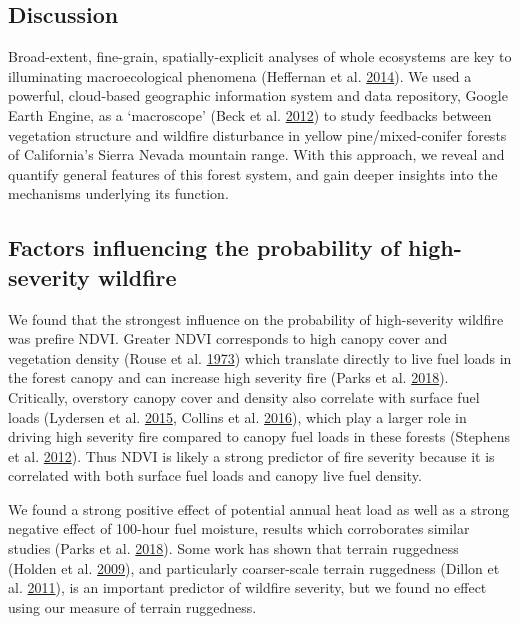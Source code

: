 \documentclass[twoside,12pt,final]{ucthesis-CA2012}
\begin{document}
\begin{ucmainmatter}
\section{Discussion}\label{discussion}

Broad-extent, fine-grain, spatially-explicit analyses of whole
ecosystems are key to illuminating macroecological phenomena (Heffernan
et al. \protect\hyperlink{ref-heffernan2014}{2014}). We used a powerful,
cloud-based geographic information system and data repository, Google
Earth Engine, as a `macroscope' (Beck et al.
\protect\hyperlink{ref-beck2012}{2012}) to study feedbacks between
vegetation structure and wildfire disturbance in yellow
pine/mixed-conifer forests of California's Sierra Nevada mountain range.
With this approach, we reveal and quantify general features of this
forest system, and gain deeper insights into the mechanisms underlying
its function.

\subsection{Factors influencing the probability of high-severity
wildfire}\label{factors-influencing-the-probability-of-high-severity-wildfire}

We found that the strongest influence on the probability of
high-severity wildfire was prefire NDVI. Greater NDVI corresponds to
high canopy cover and vegetation density (Rouse et al.
\protect\hyperlink{ref-rouse1973}{1973}) which translate directly to
live fuel loads in the forest canopy and can increase high severity fire
(Parks et al. \protect\hyperlink{ref-parks2018}{2018}). Critically,
overstory canopy cover and density also correlate with surface fuel
loads (Lydersen et al. \protect\hyperlink{ref-lydersen2015}{2015},
Collins et al. \protect\hyperlink{ref-collins2016}{2016}), which play a
larger role in driving high severity fire compared to canopy fuel loads
in these forests (Stephens et al.
\protect\hyperlink{ref-stephens2012a}{2012}). Thus NDVI is likely a
strong predictor of fire severity because it is correlated with both
surface fuel loads and canopy live fuel density.

We found a strong positive effect of potential annual heat load as well
as a strong negative effect of 100-hour fuel moisture, results which
corroborates similar studies (Parks et al.
\protect\hyperlink{ref-parks2018}{2018}). Some work has shown that
terrain ruggedness (Holden et al.
\protect\hyperlink{ref-holden2009}{2009}), and particularly
coarser-scale terrain ruggedness (Dillon et al.
\protect\hyperlink{ref-dillon2011}{2011}), is an important predictor of
wildfire severity, but we found no effect using our measure of terrain
ruggedness.


\end{ucmainmatter}
\end{document}
